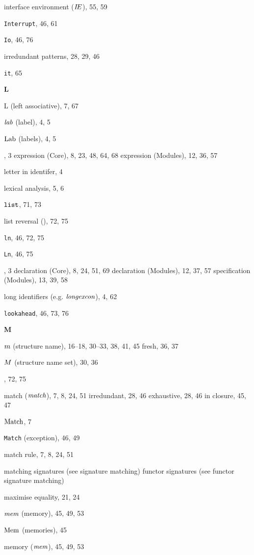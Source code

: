 \begin{theindex}
\item interface environment ($\mbox{$I\!E$}$), 55, 59
\item {\tt Interrupt}, 46, 61
\item {\tt Io}, 46, 76
\item irredundant patterns, 28, 29, 46
\item {\tt it}, 65
\indexspace
\parbox{65mm}{\hfil{\large\bf L}\hfil}
\indexspace
\item L (left associative), 7, 67
\item ${\it lab}$ (label), 4, 5
\item ${\rm Lab}$ (labels), 4, 5
\item \LET, 3
\subitem expression (Core), 8, 23, 48, 64, 68
\subitem expression (Modules), 12, 36, 57
\item letter in identifer, 4
\item lexical analysis, 5, 6
\item $\mbox{\tt list}$, 71, 73
\item list reversal (), 72, 75
\item {\tt ln}, 46, 72, 75
\item {\tt Ln}, 46, 75
\item \LOCAL, 3
\subitem declaration (Core), 8, 24, 51, 69
\subitem declaration (Modules), 12, 37, 57
\subitem specification (Modules), 13, 39, 58
\item long identifiers (e.g. ${\it longexcon}$), 4, 62
\item {\tt lookahead}, 46, 73, 76
\indexspace
\parbox{65mm}{\hfil{\large\bf M}\hfil}
\indexspace
\item $m$ (structure name), 16--18, 30--33, 38, 41, 45
\subitem fresh, 36, 37
\item $M$ (structure name set), 30, 36
\item {}, 72, 75
\item match (${\it match}$), 7, 8, 24, 51
\subitem irredundant, 28, 46
\subitem exhaustive, 28, 46
\subitem in closure, 45, 47
\item ${\rm Match}$, 7
\item {\tt Match} (exception), 46, 49
\item match rule, 7, 8, 24, 51
\item matching 
\subitem signatures (see signature matching) 
\subitem functor signatures (see functor signature matching) 
\item maximise equality, 21, 24
\item $\mbox{\it mem}$ (memory), 45, 49, 53
\item ${\rm Mem}$ (memories), 45
\item memory ($\mbox{\it mem}$), 45, 49, 53

\end{theindex}
